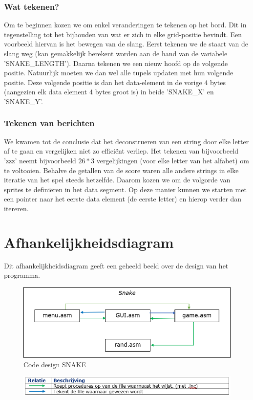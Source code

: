 \documentclass[11pt,a4paper]{article}
\begin{document}
\subsubsection{Wat tekenen?}
Om te beginnen kozen we om enkel veranderingen te tekenen op het bord.
Dit in tegenstelling tot het bijhouden van wat er zich in elke grid-positie bevindt.
Een voorbeeld hiervan is het bewegen van de slang. Eerst tekenen we de staart van de slang weg (kan gemakkelijk berekent worden aan de hand van de variabele 'SNAKE\_LENGTH'). Daarna tekenen we een nieuw hoofd op de volgende positie. Natuurlijk moeten we dan wel alle tupels updaten met hun volgende positie. Deze volgende positie is dan het data-element in de vorige 4 bytes (aangezien elk data element 4 bytes groot is) in beide 'SNAKE\_X' en 'SNAKE\_Y'.

\subsubsection{Tekenen van berichten}
We kwamen tot de conclusie dat het deconstrueren van een string door elke letter af te gaan en vergelijken niet zo effici\"ent verliep. Het tekenen van bijvoorbeeld 'zzz' neemt bijvoorbeeld $26*3$ vergelijkingen (voor elke letter van het alfabet) om te voltooien.
Behalve de getallen van de score waren alle andere strings in elke iteratie van het spel steeds hetzelfde. Daarom kozen we om de volgorde van sprites te defini\"eren in het data segment. Op deze manier kunnen we starten met een pointer naar het eerste data element (de eerste letter) en hierop verder dan itereren.

\section{Afhankelijkheidsdiagram}
Dit afhankelijkheidsdiagram geeft een geheeld beeld over de design van het programma.

\begin{figure}[h]
\centering
\includegraphics[scale=1]{afhank.png}
\caption{Code design SNAKE}
\label{fig:afhankelijkhedendiagram}
\end{figure}

\begin{figure}[h]
\centering
\includegraphics[scale=1]{relat.png}
\label{fig:relations}
\end{figure}
\end{document}
